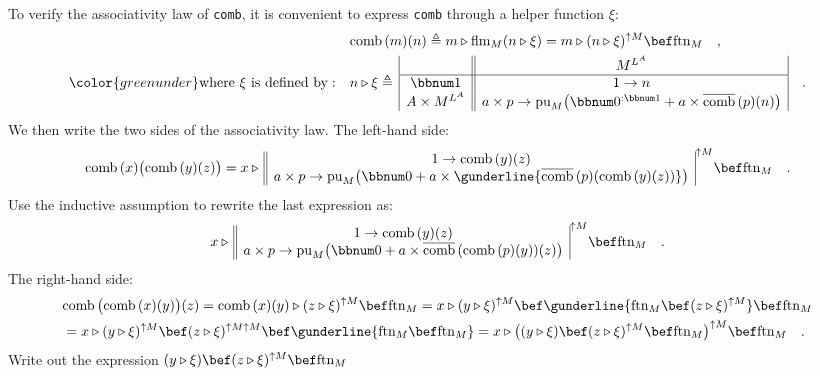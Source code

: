 To verify the associativity law of \lstinline!comb!, it is convenient
to express \lstinline!comb! through a helper function $\xi$:
\begin{align}
 & \text{comb}\,(m)(n)\triangleq m\triangleright\text{flm}_{M}(n\triangleright\xi)=m\triangleright(n\triangleright\xi)^{\uparrow M}\bef\text{ftn}_{M}\quad,\label{eq:comb-defined-via-helper-function-xi}\\
{\color{greenunder}\text{where }\xi\text{ is defined by}:}\quad & n\triangleright\xi\triangleq\,\begin{array}{|c||c|}
 & M^{L^{A}}\\
\hline \bbnum 1 & 1\rightarrow n\\
A\times M^{L^{A}} & a\times p\rightarrow\text{pu}_{M}\big(\bbnum 0^{:\bbnum 1}+a\times\overline{\text{comb}}\,(p)(n)\big)
\end{array}\quad.\nonumber 
\end{align}
We then write the two sides of the associativity law. The left-hand
side:
\[
\text{comb}\,(x)\big(\text{comb}\,(y)(z)\big)=x\triangleright\,\begin{array}{||c|}
1\rightarrow\text{comb}\,(y)(z)\\
a\times p\rightarrow\text{pu}_{M}\big(\bbnum 0+a\times\gunderline{\overline{\text{comb}}\,(p)(\text{comb}\,(y)(z))}\big)
\end{array}^{\uparrow M}\bef\text{ftn}_{M}\quad.
\]
Use the inductive assumption to rewrite the last expression as:
\[
x\triangleright\,\begin{array}{||c|}
1\rightarrow\text{comb}\,(y)(z)\\
a\times p\rightarrow\text{pu}_{M}\big(\bbnum 0+a\times\overline{\text{comb}}\,(\text{comb}\,(p)(y))(z)\big)
\end{array}^{\uparrow M}\bef\text{ftn}_{M}\quad.
\]
The right-hand side:
\begin{align*}
 & \text{comb}\,\big(\text{comb}\,(x)(y)\big)(z)=\text{comb}\,(x)(y)\triangleright(z\triangleright\xi)^{\uparrow M}\bef\text{ftn}_{M}=x\triangleright(y\triangleright\xi)^{\uparrow M}\bef\gunderline{\text{ftn}_{M}\bef(z\triangleright\xi)^{\uparrow M}}\bef\text{ftn}_{M}\\
 & =x\triangleright(y\triangleright\xi)^{\uparrow M}\bef(z\triangleright\xi)^{\uparrow M\uparrow M}\bef\gunderline{\text{ftn}_{M}\bef\text{ftn}_{M}}=x\triangleright\big((y\triangleright\xi)\bef(z\triangleright\xi)^{\uparrow M}\bef\text{ftn}_{M}\big)^{\uparrow M}\bef\text{ftn}_{M}\quad.
\end{align*}
Write out the expression $(y\triangleright\xi)\bef(z\triangleright\xi)^{\uparrow M}\bef\text{ftn}_{M}$
